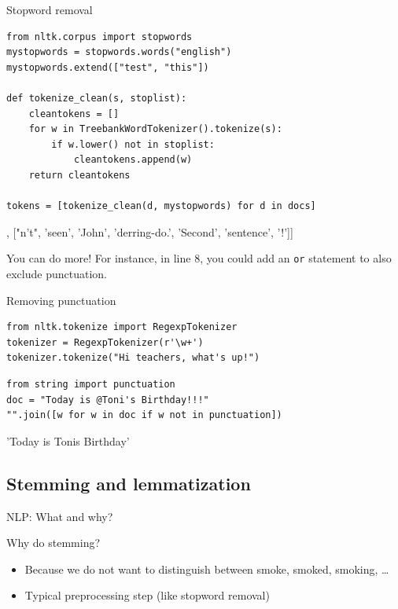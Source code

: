 \documentclass[handout]{beamer}
\begin{document}
\begin{frame}[fragile]{Stopword removal}
\begin{lstlisting}
from nltk.corpus import stopwords
mystopwords = stopwords.words("english")
mystopwords.extend(["test", "this"])

def tokenize_clean(s, stoplist):
    cleantokens = []
    for w in TreebankWordTokenizer().tokenize(s):
        if w.lower() not in stoplist:
            cleantokens.append(w)
    return cleantokens

tokens = [tokenize_clean(d, mystopwords) for d in docs]
\end{lstlisting}
\begin{lstlistingoutputtiny}
[['text'], ["n't", 'seen', 'John', 'derring-do.', 'Second', 'sentence', '!']]
\end{lstlistingoutputtiny}

\begin{alertblock}{You can do more!}
\tiny{For instance, in line 8, you could add an \texttt{or} statement to also exclude punctuation.}
\end{alertblock}

\end{frame}


\begin{frame}[fragile]{Removing punctuation}
\begin{lstlisting}
from nltk.tokenize import RegexpTokenizer
tokenizer = RegexpTokenizer(r'\w+')
tokenizer.tokenize("Hi teachers, what's up!")
\end{lstlisting}  
\begin{lstlistingoutputtiny}
\end{lstlistingoutputtiny}
\begin{lstlisting}
from string import punctuation
doc = "Today is @Toni's Birthday!!!"
"".join([w for w in doc if w not in punctuation])
\end{lstlisting}  
\begin{lstlistingoutputtiny}
'Today is Tonis Birthday'
\end{lstlistingoutputtiny}

\end{frame}


\subsection{Stemming and lemmatization}


\begin{frame}{NLP: What and why?}
\begin{block}{Why do stemming?}
	\begin{itemize}
		\item Because we do not want to distinguish between smoke, smoked, smoking, \ldots
		\item Typical preprocessing step (like stopword removal)
	\end{itemize}
\end{block}
\end{frame}
\end{document}
